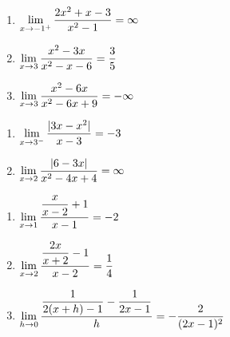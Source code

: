 \documentclass{ximera}
\begin{document}
\begin{enumerate}
\setcounter{enumi}{\value{HW}}

\item   $\ds{\lim_{x \rightarrow -1^{+}} \dfrac{2x^2+x-3}{x^2-1} = \infty}$

\medskip

\item  $\ds{\lim_{x \rightarrow 3} \dfrac{x^2-3x}{x^2-x-6} = \frac{3}{5}}$


\medskip

\item  $\ds{\lim_{x \rightarrow 3} \dfrac{x^2-6x}{x^2-6x+9} = -\infty}$

\medskip

\setcounter{HW}{\value{enumi}}
\end{enumerate}




\begin{enumerate}
\setcounter{enumi}{\value{HW}}

\item  $\ds{ \lim_{x \rightarrow 3^{-}} \dfrac{|3x - x^2| }{x-3} = -3}$ 

\medskip    

\item $\ds{\lim_{x \rightarrow 2} \dfrac{|6-3x|}{x^2-4x+4} = \infty}$

\medskip

\setcounter{HW}{\value{enumi}}
\end{enumerate}

\begin{enumerate}
\setcounter{enumi}{\value{HW}}

\item  $\ds{\lim_{x \rightarrow 1} \dfrac{\dfrac{x}{x-2} +1}{x-1} = -2}$

\medskip

\item $\ds{ \lim_{x \rightarrow 2} \dfrac{\dfrac{2x}{x+2}  -1}{x-2}  = \frac{1}{4}}$ 

\medskip
     
\item $\ds{ \lim_{h \rightarrow 0} \dfrac{\dfrac{1}{2(x+h) - 1}  - \dfrac{1}{2x-1} }{h} = -\frac{2}{(2x-1)^2} }$ 

\medskip

\setcounter{HW}{\value{enumi}}
\end{enumerate}
\end{document}
